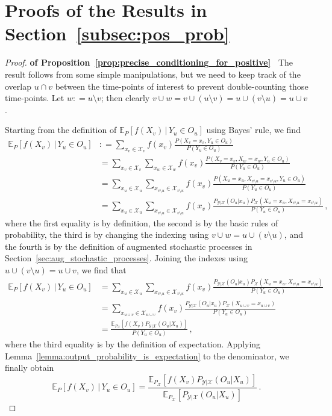 \documentclass[twoside,11pt]{article}
\newcommand{\states}{\mathcal{X}}
\newcommand{\observs}{\mathcal{Y}}
\newcommand{\coloneqq}{:\!=}
\begin{document}
\section{Proofs of the Results in Section~\ref{subsec:pos_prob}}

\begin{proof}{\bf of Proposition~\ref{prop:precise_conditioning_for_positive}~}
The result follows from some simple manipulations, but we need to keep track of the overlap $u\cap v$ between the time-points of interest to prevent double-counting those time-points. Let $w\coloneqq u\setminus v$; then clearly $v\cup w = v\cup (u\setminus v) = u\cup (v\setminus u)=u\cup v$.

Starting from the definition of $\mathbb{E}_P[f(X_v)\,\vert\,Y_u\in O_u]$ using Bayes' rule, we find
\begin{align*}
\mathbb{E}_P[f(X_v)\,\vert\,Y_u\in O_u] &\coloneqq \sum_{x_v\in\states_v} f(x_v)\frac{P(X_v=x_v, Y_u\in O_u)}{P(Y_u\in O_u)} \\
&= \sum_{x_v\in\states_v} \sum_{x_w\in\states_w} f(x_v)\frac{P(X_v=x_v, X_w=x_w, Y_u\in O_u)}{P(Y_u\in O_u)} \\
&= \sum_{x_u\in\states_u}\sum_{x_{v\setminus u}\in\states_{v\setminus u}} f(x_v)\frac{P(X_u=x_u, X_{v\setminus u}=x_{v\setminus u}, Y_u\in O_u)}{P(Y_u\in O_u)} \\
&= \sum_{x_u\in\states_u}\sum_{x_{v\setminus u}\in\states_{v\setminus u}} f(x_v)\frac{P_{\observs\vert\states}(O_u\vert x_u)P_\states(X_u=x_u, X_{v\setminus u}=x_{v\setminus u})}{P(Y_u\in O_u)}\,,
\end{align*}
where the first equality is by definition, the second is by the basic rules of probability, the third is by changing the indexing using $v\cup w=u\cup(v\setminus u)$, and the fourth is by the definition of augmented stochastic processes in Section~\ref{sec:aug_stochastic_processes}. Joining the indexes using $u\cup(v\setminus u)=u\cup v$, we find that
\begin{align*}
\mathbb{E}_P[f(X_v)\,\vert\,Y_u\in O_u] &= \sum_{x_u\in\states_u}\sum_{x_{v\setminus u}\in\states_{v\setminus u}} f(x_v)\frac{P_{\observs\vert\states}(O_u\vert x_u)P_\states(X_u=x_u, X_{v\setminus u}=x_{v\setminus u})}{P(Y_u\in O_u)} \\
 &= \sum_{x_{u\cup v}\in\states_{u\cup v}} f(x_v)\frac{P_{\observs\vert\states}(O_u\vert x_u)P_\states(X_{u\cup v}=x_{u\cup v})}{P(Y_u\in O_u)} \\
 &= \frac{\mathbb{E}_{P_\states}[f(X_v)P_{\observs\vert\states}(O_u\vert X_u)]}{P(Y_u\in O_u)}\,,
\end{align*}
where the third equality is by the definition of expectation. Applying Lemma~\ref{lemma:output_probability_is_expectation} to the denominator, we finally obtain
\begin{equation*}
\mathbb{E}_P[f(X_v)\,\vert\,Y_u\in O_u] = \frac{\mathbb{E}_{P_\states}[f(X_v)P_{\observs\vert\states}(O_u\vert X_u)]}{\mathbb{E}_{P_\states}[P_{\observs\vert\states}(O_u\vert X_u)]}\,.
\end{equation*}
\end{proof}
\end{document}
